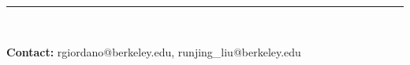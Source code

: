 \documentclass[a0,plainsections,30pt]{sciposter}\usepackage[]{graphicx}\usepackage[]{color}
\newenvironment{knitrout}{}{} %
\begin{document}
\begin{minipage}[t]{0.45\textwidth}
\begin{knitrout}
{}



\end{knitrout}

%

\begin{center}
\noindent\rule{0.95\textwidth}{1pt}
\end{center}


\end{minipage}\\

\begin{center}

{\bf Contact: } rgiordano@berkeley.edu, runjing\_liu@berkeley.edu

\end{center}
\end{document}
